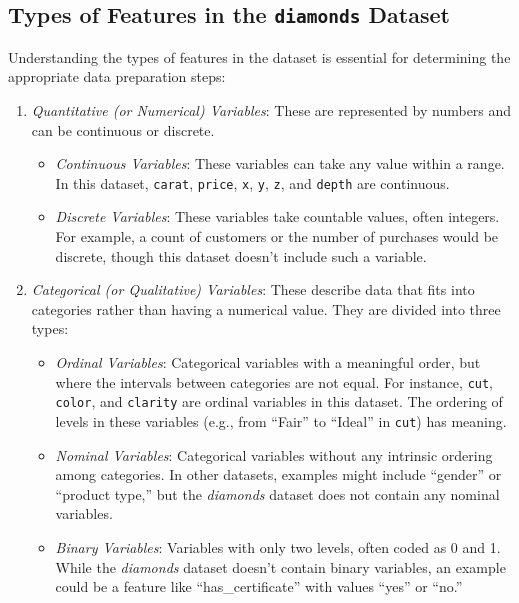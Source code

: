 \documentclass[
  11pt,
]{book}
\providecommand{\tightlist}{%
  \setlength{\itemsep}{0pt}\setlength{\parskip}{0pt}}
\theoremstyle{definition}
\theoremstyle{definition}
\theoremstyle{definition}
\theoremstyle{definition}
\theoremstyle{remark}
\begin{document}
\subsection*{\texorpdfstring{Types of Features in the \texttt{diamonds} Dataset}{Types of Features in the diamonds Dataset}}\label{types-of-features-in-the-diamonds-dataset}


Understanding the types of features in the dataset is essential for determining the appropriate data preparation steps:

\begin{enumerate}
\def\labelenumi{\arabic{enumi}.}
\tightlist
\item
  \emph{Quantitative (or Numerical) Variables}: These are represented by numbers and can be continuous or discrete.

  \begin{itemize}
  \tightlist
  \item
    \emph{Continuous Variables}: These variables can take any value within a range. In this dataset, \texttt{carat}, \texttt{price}, \texttt{x}, \texttt{y}, \texttt{z}, and \texttt{depth} are continuous.
  \item
    \emph{Discrete Variables}: These variables take countable values, often integers. For example, a count of customers or the number of purchases would be discrete, though this dataset doesn't include such a variable.
  \end{itemize}
\item
  \emph{Categorical (or Qualitative) Variables}: These describe data that fits into categories rather than having a numerical value. They are divided into three types:

  \begin{itemize}
  \tightlist
  \item
    \emph{Ordinal Variables}: Categorical variables with a meaningful order, but where the intervals between categories are not equal. For instance, \texttt{cut}, \texttt{color}, and \texttt{clarity} are ordinal variables in this dataset. The ordering of levels in these variables (e.g., from ``Fair'' to ``Ideal'' in \texttt{cut}) has meaning.
  \item
    \emph{Nominal Variables}: Categorical variables without any intrinsic ordering among categories. In other datasets, examples might include ``gender'' or ``product type,'' but the \emph{diamonds} dataset does not contain any nominal variables.
  \item
    \emph{Binary Variables}: Variables with only two levels, often coded as 0 and 1. While the \emph{diamonds} dataset doesn't contain binary variables, an example could be a feature like ``has\_certificate'' with values ``yes'' or ``no.''
  \end{itemize}
\end{enumerate}
\end{document}
